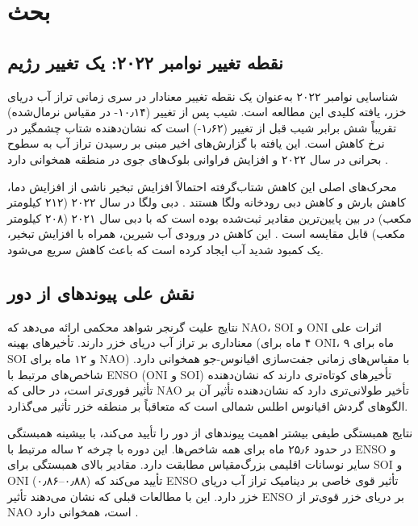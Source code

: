 \documentclass[12pt,a4paper,twocolumn]{article}
\begin{document}
\section{بحث}

\subsection{نقطه تغییر نوامبر ۲۰۲۲: یک تغییر رژیم}

شناسایی نوامبر ۲۰۲۲ به‌عنوان یک نقطه تغییر معنادار در سری زمانی تراز آب دریای خزر، یافته کلیدی این مطالعه است. شیب پس از تغییر (۱۰٫۱۴- در مقیاس نرمال‌شده) تقریباً شش برابر شیب قبل از تغییر (۱٫۶۲-) است که نشان‌دهنده شتاب چشمگیر در نرخ کاهش است. این یافته با گزارش‌های اخیر مبنی بر رسیدن تراز آب به سطوح بحرانی در سال ۲۰۲۲ و افزایش فراوانی بلوک‌های جوی در منطقه همخوانی دارد \citep{cabar2024, springer2025}.

محرک‌های اصلی این کاهش شتاب‌گرفته احتمالاً افزایش تبخیر ناشی از افزایش دما، کاهش بارش و کاهش دبی رودخانه ولگا هستند \citep{channelnewsasia2024}. دبی ولگا در سال ۲۰۲۲ (۲۱۲ کیلومتر مکعب) در بین پایین‌ترین مقادیر ثبت‌شده بوده است که با دبی سال ۲۰۲۱ (۲۰۸ کیلومتر مکعب) قابل مقایسه است \citep{cabar2023}. این کاهش در ورودی آب شیرین، همراه با افزایش تبخیر، یک کمبود شدید آب ایجاد کرده است که باعث کاهش سریع می‌شود.

\subsection{نقش علی پیوندهای از دور}

نتایج علیت گرنجر شواهد محکمی ارائه می‌دهد که NAO، SOI و ONI اثرات علی معناداری بر تراز آب دریای خزر دارند. تأخیرهای بهینه (۴ ماه برای ONI، ۹ ماه برای SOI و ۱۲ ماه برای NAO) با مقیاس‌های زمانی جفت‌سازی اقیانوس-جو همخوانی دارد. شاخص‌های مرتبط با ENSO (ONI و SOI) تأخیرهای کوتاه‌تری دارند که نشان‌دهنده تأثیر فوری‌تر است، در حالی که NAO تأخیر طولانی‌تری دارد که نشان‌دهنده تأثیر آن بر الگوهای گردش اقیانوس اطلس شمالی است که متعاقباً بر منطقه خزر تأثیر می‌گذارد.

نتایج همبستگی طیفی بیشتر اهمیت پیوندهای از دور را تأیید می‌کند، با بیشینه همبستگی در حدود ۲۵٫۶ ماه برای همه شاخص‌ها. این دوره با چرخه ۲ ساله مرتبط با ENSO و سایر نوسانات اقلیمی بزرگ‌مقیاس مطابقت دارد. مقادیر بالای همبستگی برای SOI و ONI (۰٫۸۶–۰٫۸۸) تأیید می‌کند که ENSO تأثیر قوی خاصی بر دینامیک تراز آب دریای خزر دارد. این با مطالعات قبلی که نشان می‌دهند تأثیر ENSO بر دریای خزر قوی‌تر از NAO است، همخوانی دارد \citep{openpolar2025}.
\end{document}
